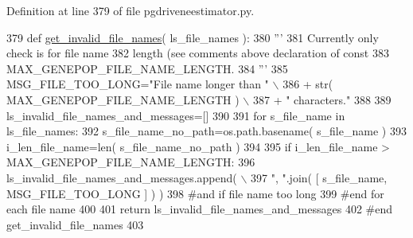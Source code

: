 Definition at line 379 of file pgdriveneestimator.\+py.


\begin{DoxyCode}
379 \textcolor{keyword}{def }\hyperlink{namespacenegui_1_1pgdriveneestimator_a944008262ae2ee7c6fc796499be626ce}{get\_invalid\_file\_names}( ls\_file\_names ):
380     \textcolor{stringliteral}{'''}
381 \textcolor{stringliteral}{    Currently only check is for file name}
382 \textcolor{stringliteral}{    length (see comments above declaration of const }
383 \textcolor{stringliteral}{    MAX\_GENEPOP\_FILE\_NAME\_LENGTH.}
384 \textcolor{stringliteral}{    '''}
385     MSG\_FILE\_TOO\_LONG=\textcolor{stringliteral}{"File name longer than "} \(\backslash\)
386             + str( MAX\_GENEPOP\_FILE\_NAME\_LENGTH ) \(\backslash\)
387             + \textcolor{stringliteral}{" characters."}
388 
389     ls\_invalid\_file\_names\_and\_messages=[]
390 
391     \textcolor{keywordflow}{for} s\_file\_name \textcolor{keywordflow}{in} ls\_file\_names:
392         s\_file\_name\_no\_path=os.path.basename( s\_file\_name )
393         i\_len\_file\_name=len( s\_file\_name\_no\_path )
394 
395         \textcolor{keywordflow}{if} i\_len\_file\_name > MAX\_GENEPOP\_FILE\_NAME\_LENGTH:
396             ls\_invalid\_file\_names\_and\_messages.append( \(\backslash\)
397                     \textcolor{stringliteral}{", "}.join( [ s\_file\_name, MSG\_FILE\_TOO\_LONG ] ) )
398         \textcolor{comment}{#and if file name too long}
399     \textcolor{comment}{#end for each file name}
400 
401     \textcolor{keywordflow}{return} ls\_invalid\_file\_names\_and\_messages
402 \textcolor{comment}{#end get\_invalid\_file\_names}
403 
\end{DoxyCode}
